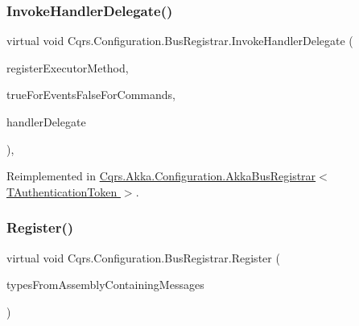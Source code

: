 \subsubsection{\texorpdfstring{Invoke\+Handler\+Delegate()}{InvokeHandlerDelegate()}}
{\footnotesize\ttfamily virtual void Cqrs.\+Configuration.\+Bus\+Registrar.\+Invoke\+Handler\+Delegate (\begin{DoxyParamCaption}\item[{Method\+Info}]{register\+Executor\+Method,  }\item[{bool}]{true\+For\+Events\+False\+For\+Commands,  }\item[{\hyperlink{classCqrs_1_1Configuration_1_1HandlerDelegate}{Handler\+Delegate}}]{handler\+Delegate }\end{DoxyParamCaption})\hspace{0.3cm}{\ttfamily [protected]}, {\ttfamily [virtual]}}



Reimplemented in \hyperlink{classCqrs_1_1Akka_1_1Configuration_1_1AkkaBusRegistrar_a0ac474751b2ba8ebb27b885a15fbf053}{Cqrs.\+Akka.\+Configuration.\+Akka\+Bus\+Registrar$<$ T\+Authentication\+Token $>$}.

\mbox{\label{classCqrs_1_1Configuration_1_1BusRegistrar_ab8deb04dc9cb6b80f32b54c847dfb1b3}} 
\subsubsection{\texorpdfstring{Register()}{Register()}\hspace{0.1cm}{\footnotesize\ttfamily [1/2]}}
{\footnotesize\ttfamily virtual void Cqrs.\+Configuration.\+Bus\+Registrar.\+Register (\begin{DoxyParamCaption}\item[{params Type \mbox{[}$\,$\mbox{]}}]{types\+From\+Assembly\+Containing\+Messages }\end{DoxyParamCaption})\hspace{0.3cm}{\ttfamily [virtual]}}

\mbox{\label{classCqrs_1_1Configuration_1_1BusRegistrar_abc3af2b8dfeeb49f5e5461456ae01f67}} 
